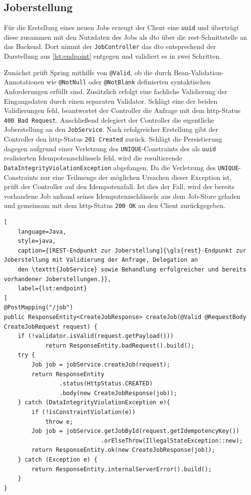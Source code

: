 \subsection{Joberstellung}
\label{subsec:impl_joberstellung}
Für die Erstellung eines neuen Jobs erzeugt der Client eine \texttt{\gls{uuid}} und überträgt
diese zusammen mit den Nutzdaten des Jobs als \gls{dto} über die \gls{rest}-Schnittstelle an das Backend.
Dort nimmt der \texttt{JobController} das \gls{dto} entsprechend der Darstellung aus \cref{lst:endpoint} entgegen und validiert
es in zwei Schritten.

Zunächst prüft Spring mithilfe von \texttt{@Valid}, ob die durch Bean-Validation-Annotationen wie \texttt{@NotNull} oder
\texttt{@NotBlank} definierten syntaktischen Anforderungen erfüllt sind.
Zusätzlich erfolgt eine fachliche Validierung der Eingangsdaten durch einen separaten Validator.
Schlägt eine der beiden Validierungen fehl, beantwortet der Controller die Anfrage mit dem \gls{http}-Status \texttt{400 Bad Request}.
Anschließend delegiert der Controller die eigentliche Joberstellung an den \texttt{JobService}.
Nach erfolgreicher Erstellung gibt der Controller den \gls{http}-Status \texttt{201 Created} zurück.
Schlägt die Persistierung dagegen aufgrund einer Verletzung des \texttt{UNIQUE}-Constraints des als \texttt{\gls{uuid}}
realisierten Idempotenzschlüssels fehl, wird die resultierende \texttt{DataIntegrityViolationException} abgefangen.
Da die Verletzung des \texttt{UNIQUE}-Constraints nur eine Teilmenge der möglichen Ursachen dieser Exception ist, prüft
der Controller auf den Idempotenzfall.
Ist dies der Fall, wird der bereits vorhandene Job anhand seines Idempotenzschlüssels aus dem Job-Store geladen und gemeinsam
mit dem \gls{http}-Status \texttt{200 OK} an den Client zurückgegeben.

\begin{lstlisting}[
    language=Java,
    style=java,
    caption={[REST-Endpunkt zur Joberstellung]{\gls{rest}-Endpunkt zur Joberstellung mit Validierung der Anfrage, Delegation an
    den \texttt{JobService} sowie Behandlung erfolgreicher und bereits vorhandener Joberstellungen.}},
    label={lst:endpoint}
]
@PostMapping("/job")
public ResponseEntity<CreateJobResponse> createJob(@Valid @RequestBody CreateJobRequest request) {
    if (!validator.isValid(request.getPayload()))
            return ResponseEntity.badRequest().build();
    try {
        Job job = jobService.createJob(request);
        return ResponseEntity
                .status(HttpStatus.CREATED)
                .body(new CreateJobResponse(job));
    } catch (DataIntegrityViolationException e){
        if (!isConstraintViolation(e))
            throw e;
        Job job = jobService.getJobById(request.getIdempotencyKey())
                            .orElseThrow(IllegalStateException::new);
        return ResponseEntity.ok(new CreateJobResponse(job));
    } catch (Exception e) {
        return ResponseEntity.internalServerError().build();
    }
}
\end{lstlisting}

